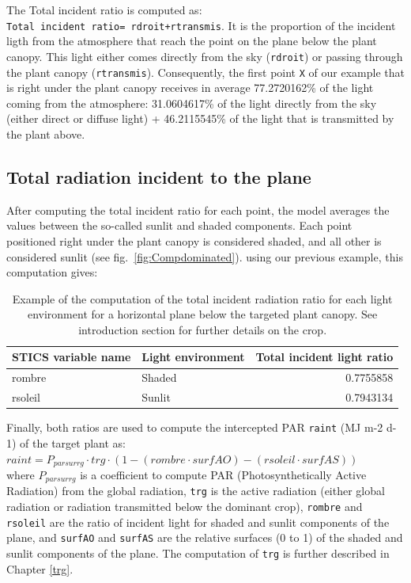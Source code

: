 \documentclass[]{book}
\begin{document}
The Total incident ratio is computed as: \texttt{Total\ incident\ ratio=\ rdroit+rtransmis}. It is the proportion of the incident ligth from the atmosphere that reach the point on the plane below the plant canopy. This light either comes directly from the sky (\texttt{rdroit}) or passing through the plant canopy (\texttt{rtransmis}).
Consequently, the first point \texttt{X} of our example that is right under the plant canopy receives in average 77.2720162\% of the light coming from the atmosphere: 31.0604617\% of the light directly from the sky (either direct or diffuse light) + 46.2115545\% of the light that is transmitted by the plant above.

\hypertarget{total-radiation-incident-to-the-plane}{%
\subsection{Total radiation incident to the plane}\label{total-radiation-incident-to-the-plane}}

After computing the total incident ratio for each point, the model averages the values between the so-called sunlit and shaded components. Each point positioned right under the plant canopy is considered shaded, and all other is considered sunlit (see fig.~\ref{fig:Compdominated}). using our previous example, this computation gives:

\begin{table}[t]

\caption{\label{tab:unnamed-chunk-6}Example of the computation of the total incident radiation ratio for each light environment for a horizontal plane below the targeted plant canopy. See introduction section for further details on the crop.}
\centering
\begin{tabular}{l|l|r}
\hline
STICS variable name & Light environment & Total incident light ratio\\
\hline
rombre & Shaded & 0.7755858\\
\hline
rsoleil & Sunlit & 0.7943134\\
\hline
\end{tabular}
\end{table}

Finally, both ratios are used to compute the intercepted PAR \texttt{raint} (MJ m-2 d-1) of the target plant as:\\
\(raint=P_{parsurrg}\cdot trg\cdot(1-(rombre\cdot surfAO)-(rsoleil\cdot surfAS))\)\\
where \(P_{parsurrg}\) is a coefficient to compute PAR (Photosynthetically Active Radiation) from the global radiation, \texttt{trg} is the active radiation (either global radiation or radiation transmitted below the dominant crop), \texttt{rombre} and \texttt{rsoleil} are the ratio of incident light for shaded and sunlit components of the plane, and \texttt{surfAO} and \texttt{surfAS} are the relative surfaces (0 to 1) of the shaded and sunlit components of the plane.
The computation of \texttt{trg} is further described in Chapter \ref{trg}.
\end{document}
